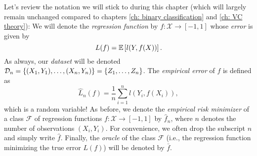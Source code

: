 Let's review the notation we will stick to during this chapter (which will largely remain unchanged compared to chapters \ref{ch: binary classification} and \ref{ch: VC theory}): We will denote the \emph{regression function} by $f \colon \mathcal{X} \to [-1, 1]$ whose \emph{error} is given by
\[
    L(f) = \mathbb{E}\left[l(Y, f(X))\right].
\]
As always, our \emph{dataset} will be denoted $\mathcal{D}_n = \left\{(X_1, Y_1), \dots, (X_n, Y_n)\right\} = \left\{Z_1, \dots, Z_n\right\}$. The \emph{empirical error} of $f$ is defined as
\[
    \hat L_n(f) = \frac{1}{n} \sum_{i=1}^n l(Y_i, f(X_i)),
\]
which is a random variable! As before, we denote the \emph{empirical risk minimizer} of a class $\mathcal{F}$ of regression functions $f \colon \mathcal{X} \to [-1, 1]$ by $\hat f_n$, where $n$ denotes the number of observations $(X_i, Y_i)$. For convenience, we often drop the subscript $n$ and simply write $\hat f$. Finally, the \emph{oracle} of the class $\mathcal{F}$ (i.e., the regression function minimizing the true error $L(f)$) will be denoted by $\bar f$.
